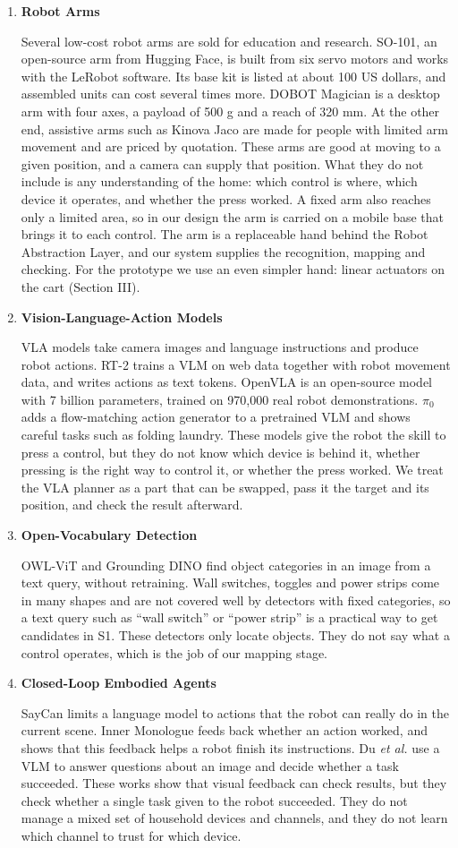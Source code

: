 \documentclass[conference]{IEEEtran}
\newcommand{\itemhead}[1]{\item \textbf{#1}\par\nobreak}
\begin{document}
\begin{enumerate}
\itemhead{Robot Arms}
Several low-cost robot arms are sold for education and research. SO-101, an open-source arm from Hugging Face, is built from six servo motors and works with the LeRobot software. Its base kit is listed at about 100 US dollars, and assembled units can cost several times more. DOBOT Magician is a desktop arm with four axes, a payload of 500 g and a reach of 320 mm. At the other end, assistive arms such as Kinova Jaco are made for people with limited arm movement and are priced by quotation. These arms are good at moving to a given position, and a camera can supply that position. What they do not include is any understanding of the home: which control is where, which device it operates, and whether the press worked. A fixed arm also reaches only a limited area, so in our design the arm is carried on a mobile base that brings it to each control. The arm is a replaceable hand behind the Robot Abstraction Layer, and our system supplies the recognition, mapping and checking. For the prototype we use an even simpler hand: linear actuators on the cart (Section III).

\itemhead{Vision-Language-Action Models}
VLA models take camera images and language instructions and produce robot actions. RT-2 trains a VLM on web data together with robot movement data, and writes actions as text tokens. OpenVLA is an open-source model with 7 billion parameters, trained on 970,000 real robot demonstrations. $\pi_0$ adds a flow-matching action generator to a pretrained VLM and shows careful tasks such as folding laundry. These models give the robot the skill to press a control, but they do not know which device is behind it, whether pressing is the right way to control it, or whether the press worked. We treat the VLA planner as a part that can be swapped, pass it the target and its position, and check the result afterward.

\itemhead{Open-Vocabulary Detection}
OWL-ViT and Grounding DINO find object categories in an image from a text query, without retraining. Wall switches, toggles and power strips come in many shapes and are not covered well by detectors with fixed categories, so a text query such as ``wall switch'' or ``power strip'' is a practical way to get candidates in S1. These detectors only locate objects. They do not say what a control operates, which is the job of our mapping stage.

\itemhead{Closed-Loop Embodied Agents}
SayCan limits a language model to actions that the robot can really do in the current scene. Inner Monologue feeds back whether an action worked, and shows that this feedback helps a robot finish its instructions. Du \emph{et al.} use a VLM to answer questions about an image and decide whether a task succeeded. These works show that visual feedback can check results, but they check whether a single task given to the robot succeeded. They do not manage a mixed set of household devices and channels, and they do not learn which channel to trust for which device.
\end{enumerate}
\end{document}

